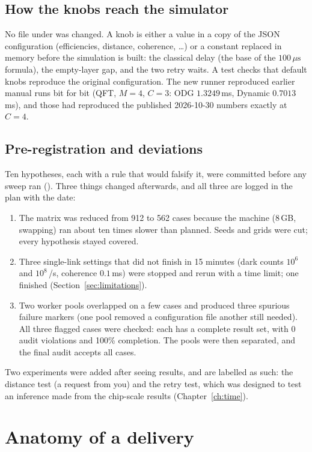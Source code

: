\documentclass[11pt,a4paper]{report}
\newcommand{\code}[1]{\texttt{\detokenize{#1}}}
\newcommand{\ms}{\,ms}
\newcommand{\us}{\,\ensuremath{\mu\mathrm{s}}}
\begin{document}
\section{How the knobs reach the simulator}
No file under \code{ace/} was changed. A knob is either a value in a copy of the JSON configuration (efficiencies, distance, coherence, \dots) or a constant replaced in memory before the simulation is built: the classical delay (the base of the $100\us{}$ formula), the empty-layer gap, and the two retry waits. A test checks that default knobs reproduce the original configuration. The new runner reproduced earlier manual runs bit for bit (QFT, $M=4$, $C=3$: ODG $1.3249$\ms{}, Dynamic $0.7013$\ms{}), and those had reproduced the published 2026-10-30 numbers exactly at $C=4$.

\section{Pre-registration and deviations}
Ten hypotheses, each with a rule that would falsify it, were committed before any sweep ran (\code{plan.md}). Three things changed afterwards, and all three are logged in the plan with the date:
\begin{enumerate}
\item The matrix was reduced from 912 to 562 cases because the machine (8\,GB, swapping) ran about ten times slower than planned. Seeds and grids were cut; every hypothesis stayed covered.
\item Three single-link settings that did not finish in 15 minutes (dark counts $10^6$ and $10^8$\,/s, coherence $0.1$\,ms) were stopped and rerun with a time limit; one finished (Section~\ref{sec:limitations}).
\item Two worker pools overlapped on a few cases and produced three spurious failure markers (one pool removed a configuration file another still needed). All three flagged cases were checked: each has a complete result set, with 0 audit violations and 100\% completion. The pools were then separated, and the final audit accepts all \CasesAccepted{} cases.
\end{enumerate}
Two experiments were added after seeing results, and are labelled as such: the distance test (a request from you) and the retry test, which was designed to test an inference made from the chip-scale results (Chapter~\ref{ch:time}).

\chapter{Anatomy of a delivery}\label{ch:anatomy}
\end{document}
